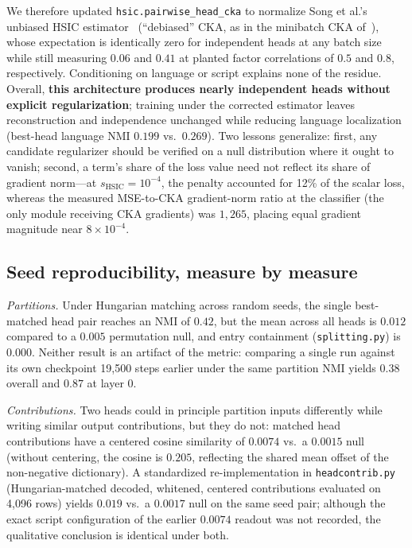 We therefore updated \texttt{hsic.pairwise\_head\_cka} to normalize Song
et al.'s unbiased HSIC estimator~\cite[Eq.~5]{song2012} (``debiased''
CKA, as in the minibatch CKA of~\cite{nguyen2021}), whose expectation is
identically zero for independent heads at any batch size while still
measuring $0.06$ and $0.41$ at planted factor correlations of $0.5$ and
$0.8$, respectively. Conditioning on language or script explains none
of the residue. Overall, \textbf{this
architecture produces nearly independent heads without explicit
regularization}; training under the corrected estimator leaves
reconstruction and independence unchanged while reducing language
localization (best-head language NMI $0.199$ vs.\ $0.269$). Two lessons
generalize: first, any candidate regularizer should be verified on a null
distribution where it ought to vanish; second, a term's share of the
loss value need not reflect its share of gradient norm---at
$s_{\mathrm{HSIC}}{=}10^{-4}$, the penalty accounted for 12\% of the
scalar loss, whereas the measured MSE-to-CKA gradient-norm ratio at the
classifier (the only module receiving CKA gradients) was $1{,}265$,
placing equal gradient magnitude near $8\times10^{-4}$.

\subsection{Seed reproducibility, measure by measure}
\label{sec:seedsdetail}

\emph{Partitions.} Under Hungarian matching across random seeds, the
single best-matched head pair reaches an NMI of $0.42$, but the mean
across all heads is $0.012$ compared to a $0.005$ permutation null, and
entry containment (\texttt{splitting.py}) is $0.000$. Neither result is
an artifact of the metric: comparing a single run against its own
checkpoint 19{,}500 steps earlier under the same partition NMI yields
$0.38$ overall and $0.87$ at layer 0.

\emph{Contributions.} Two heads could in principle partition inputs
differently while writing similar output contributions, but they do not:
matched head contributions have a centered cosine similarity of $0.0074$
vs.\ a $0.0015$ null (without centering, the cosine is $0.205$,
reflecting the shared mean offset of the non-negative dictionary). A
standardized re-implementation in \texttt{headcontrib.py}
(Hungarian-matched decoded, whitened, centered contributions evaluated on
4{,}096 rows) yields $0.019$ vs.\ a $0.0017$ null on the same seed pair;
although the exact script configuration of the earlier $0.0074$ readout
was not recorded, the qualitative conclusion is identical under both.

